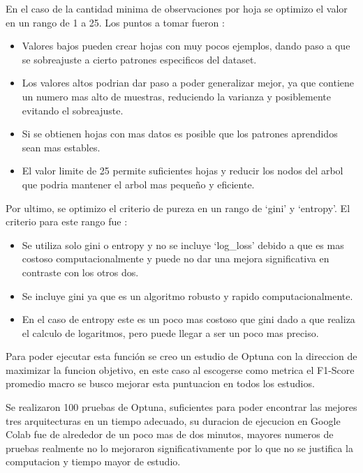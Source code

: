 \documentclass[12pt,a4paper]{article}
\begin{document}
En el caso de la cantidad minima de observaciones por hoja se optimizo el valor en un rango de 1 a 25.
Los puntos a tomar fueron \autocite{ConfigureDecisionTreeClassifierMin_samples_leaf,wijayaNBDLite42023}:
\begin{itemize}
  \item Valores bajos pueden crear hojas con muy pocos ejemplos, dando paso a que se
    sobreajuste a cierto patrones especificos del dataset.
  \item Los valores altos podrian dar paso a poder generalizar mejor, ya que contiene un numero
    mas alto de muestras, reduciendo la varianza y posiblemente evitando el sobreajuste.
  \item Si se obtienen hojas con mas datos es posible que los patrones aprendidos sean mas estables.
  \item El valor limite de 25 permite suficientes hojas y reducir los nodos del arbol que podria
    mantener el arbol mas pequeño y eficiente.
\end{itemize}

Por ultimo, se optimizo el criterio de pureza en un rango de `gini' y `entropy'.
El criterio para este rango fue \autocite{raschkaWhyAreWe0000,aznarDecisionTreesGini2020}:
\begin{itemize}
  \item Se utiliza solo gini o entropy y no se incluye `log_loss' debido a que es mas costoso computacionalmente y puede no dar una
    mejora significativa en contraste con los otros dos.
  \item Se incluye gini ya que es un algoritmo robusto y rapido computacionalmente.
  \item En el caso de entropy este es un poco mas costoso que gini dado a que realiza el calculo de logaritmos, pero puede
    llegar a ser un poco mas preciso.
\end{itemize}

Para poder ejecutar esta función se creo un estudio de Optuna con la direccion de maximizar la funcion objetivo,
en este caso al escogerse como metrica el F1-Score promedio macro se busco mejorar esta puntuacion en todos los estudios.

Se realizaron 100 pruebas de Optuna, suficientes para poder encontrar las mejores tres arquitecturas en un tiempo adecuado,
su duracion de ejecucion en Google Colab fue de alrededor de un poco mas de dos minutos,
mayores numeros de pruebas realmente no lo mejoraron significativamente por lo que no se justifica la computacion
y tiempo mayor de estudio.
\end{document}
